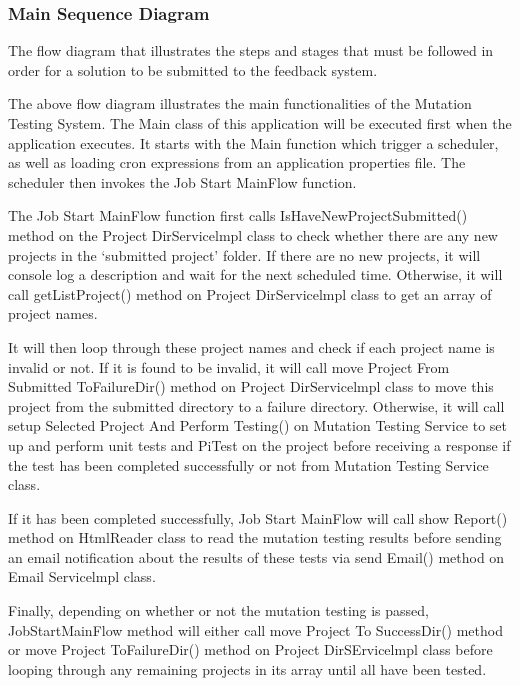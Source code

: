 \subsubsection{Main Sequence Diagram}
The flow diagram that illustrates the steps and stages that must be followed in order for a solution to be submitted to the feedback system.\par 
The above flow diagram illustrates the main functionalities of the Mutation Testing System. The Main class of this application will be executed first when the application executes. It starts with the Main function which trigger a scheduler, as well as loading cron expressions from an application properties file. The scheduler then invokes the Job Start MainFlow function.\par 
The Job Start MainFlow function first calls IsHaveNewProjectSubmitted() method on the Project DirServicelmpl class to check whether there are any new projects in the ‘submitted project’ folder. If there are no new projects, it will console log a description and wait for the next scheduled time. Otherwise, it will call getListProject() method on Project DirServicelmpl class to get an array of project names. \par 
It will then loop through these project names and check if each project name is invalid or not. If it is found to be invalid, it will call move Project From Submitted ToFailureDir() method on Project DirServicelmpl class to move this project from the submitted directory to a failure directory. Otherwise, it will call setup Selected Project And Perform Testing() on Mutation Testing Service to set up and perform unit tests and PiTest on the project before receiving a response if the test has been completed successfully or not from Mutation Testing Service class. \par 
If it has been completed successfully, Job Start MainFlow will call show Report() method on HtmlReader class to read the mutation testing results before sending an email notification about the results of these tests via send Email() method on Email Servicelmpl class. 

Finally, depending on whether or not the mutation testing is passed, JobStartMainFlow method will either call move Project To SuccessDir() method or move Project ToFailureDir() method on Project DirSErvicelmpl class before looping through any remaining projects in its array until all have been tested.

